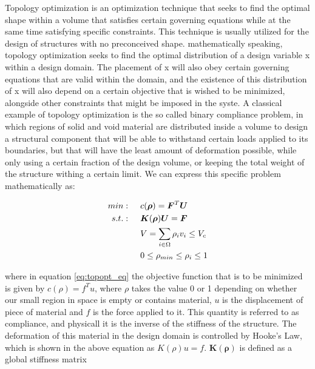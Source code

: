\documentclass[../main.tex]{subfiles}
\begin{document}
Topology optimization is an optimization technique that seeks to find the optimal shape within a volume that satisfies certain governing equations while at the same time satisfying specific constraints. This technique is usually utilized for the design of structures with no preconceived shape. mathematically speaking, topology optimization seeks to find the optimal distribution of a design variable x within a design domain. The placement of x will also obey certain governing equations that are valid within the domain, and the existence of this distribution of x will also depend on a certain objective that is wished to be minimized, alongside other constraints that might be imposed in the syste. A classical example of topology optimization is the so called binary compliance problem, in which regions of solid and void material are distributed inside a volume to design a structural component that will be able to withstand certain loads applied to its boundaries, but that will have the least amount of deformation possible, while only using a certain fraction of the design volume, or keeping the total weight of the structure withing a certain limit. We can express this specific problem mathematically as:

\begin{align} 
  min: & \hspace{0.5cm} c(\bm{\rho}) = \bm{F}^T \bm{U}  \\
  s.t.: & \hspace{0.5cm} \bm{K}(\bm{\rho})\bm{U} = \bm{F}  \\
        & \hspace{0.5cm} V = \sum _{i \in \Omega} \rho_i v_i \leq V_c \\ 
        & \hspace{0.5cm} 0 \leq \rho_{min} \leq \rho_i \leq 1
\end{align}
\label{eq:topopt_eq}

where in equation \ref{eq:topopt_eq} the objective function that is to be minimized is given by $c(\rho) = f^T u$, where $\rho$ takes the value 0 or 1 depending on whether our small region in space is empty or contains material, $u$ is the displacement of piece of material and $f$ is the force applied to it. This quantity is referred to as compliance, and physicall it is the inverse of the stiffness of the structure. The deformation of this material in the design domain is controlled by Hooke's Law, which is shown in the above equation as $K(\rho) u = f$. $\bm{K}(\bm{\rho})$ is defined as a global stiffness matrix 
\end{document}
